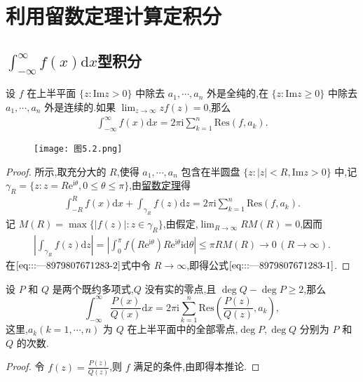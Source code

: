 \documentclass[../../main.tex]{subfiles}
\begin{document}
\section{利用留数定理计算定积分}

\subsection{$\int_{-\infty}^{\infty}{f\left( x \right) \mathrm{d}x}$型积分}

\begin{theorem}\label{theorem:定理5.5.1}
设 \( f \) 在上半平面 \( \{ z: \mathrm{Im}z > 0 \} \) 中除去 \( a_1, \cdots, a_n \) 外是全纯的,在 \( \{ z: \mathrm{Im}z \geqslant 0 \} \) 中除去 \( a_1, \cdots, a_n \) 外是连续的.如果 \( \lim_{z \to \infty} z f(z) = 0 \),那么
\begin{align}
\int_{-\infty}^{\infty} f(x) \mathrm{d}x = 2\pi \mathrm{i} \sum_{k = 1}^{n} \mathrm{Res}(f, a_k). \label{eq:::---8979807671283-1}
\end{align}
\end{theorem}
\begin{figure}[H]
\centering
\texttt{[image: 图5.2.png]}
\caption{}
\label{figure:图5.2}
\end{figure}
\begin{proof}
所示,取充分大的 \( R \),使得 \( a_1, \cdots, a_n \) 包含在半圆盘 \( \{ z: |z| < R, \mathrm{Im}z > 0 \} \) 中,记 \( \gamma_R = \{ z: z = R\mathrm{e}^{\mathrm{i}\theta}, 0 \leqslant \theta \leqslant \pi \} \),由\hyperref[theorem:留数定理(残数定理)-定理5.4.9]{留数定理}得
\begin{align}
\int_{-R}^{R} f(x) \mathrm{d}x + \int_{\gamma_R} f(z) \mathrm{d}z = 2\pi \mathrm{i} \sum_{k = 1}^{n} \mathrm{Res}(f, a_k).\label{eq:::---8979807671283-2}
\end{align}
记 \( M(R) = \max \{ |f(z)| : z \in \gamma_R \} \),由假定,\( \lim_{R \to \infty} R M(R) = 0 \),因而
\begin{align*}
\left| \int_{\gamma_R} f(z) \mathrm{d}z \right| = \left| \int_{0}^{\pi} f(R\mathrm{e}^{\mathrm{i}\theta}) R\mathrm{e}^{\mathrm{i}\theta} \mathrm{i} \mathrm{d}\theta \right| \leqslant \pi R M(R) \to 0 \, (R \to \infty).
\end{align*}
在\(\eqref{eq:::---8979807671283-2}\)式中令 \( R \to \infty \),即得公式\(\eqref{eq:::---8979807671283-1}\).

\end{proof}

\begin{corollary}\label{corollary:推论5.5.2}
设 \( P \) 和 \( Q \) 是两个既约多项式,\( Q \) 没有实的零点,且 \( \deg Q - \deg P \geqslant 2 \),那么
\[
\int_{-\infty}^{\infty} \frac{P(x)}{Q(x)} \mathrm{d}x = 2\pi \mathrm{i} \sum_{k = 1}^{n} \mathrm{Res}\left( \frac{P(z)}{Q(z)}, a_k \right),
\]
这里,\( a_k (k = 1, \cdots, n) \) 为 \( Q \) 在上半平面中的全部零点,\( \deg P, \deg Q \) 分别为 \( P \) 和 \( Q \) 的次数.
\end{corollary}
\begin{proof}
令 \( f(z) = \frac{P(z)}{Q(z)} \),则 \( f \) 满足的条件,由即得本推论.

\end{proof}
\end{document}
